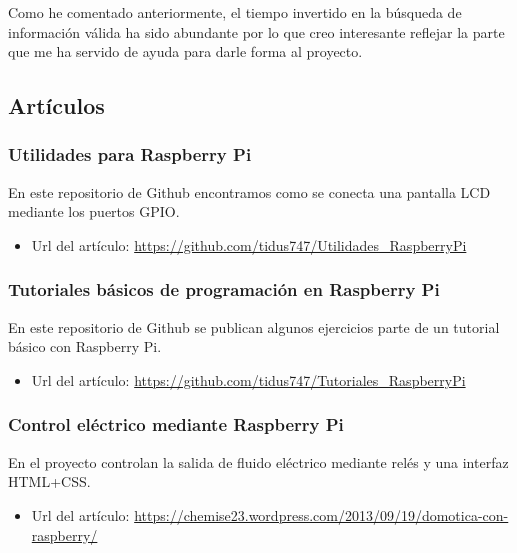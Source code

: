 \begin{comment}
Este apartado sería parecido a un estado del arte de una tesis o tesina. En un trabajo final grado no parece obligada su presencia, aunque se puede dejar a juicio del tutor el incluir un pequeño resumen comentado de los trabajos y proyectos ya realizados en el campo del proyecto en curso. 
\end{comment}

Como he comentado anteriormente, el tiempo invertido en la búsqueda de información válida ha sido abundante por lo que creo interesante reflejar la parte que me ha servido de ayuda para darle forma al proyecto.


\subsection{Artículos}
\subsubsection{Utilidades para Raspberry Pi}
En este repositorio de Github encontramos como se conecta una pantalla LCD mediante los puertos GPIO.
\begin{itemize}
    \item Url del artículo: \url{https://github.com/tidus747/Utilidades_RaspberryPi}
\end{itemize}

\subsubsection{Tutoriales básicos de programación en Raspberry Pi}
En este repositorio de Github se publican algunos ejercicios parte de un tutorial básico con Raspberry Pi.
\begin{itemize}
    \item Url del artículo: \url{https://github.com/tidus747/Tutoriales_RaspberryPi}
\end{itemize}

\subsubsection{Control eléctrico mediante Raspberry Pi}
En el proyecto controlan la salida de fluido eléctrico mediante relés y una interfaz HTML+CSS.
\begin{itemize}
    \item Url del artículo: \url{https://chemise23.wordpress.com/2013/09/19/domotica-con-raspberry/}
\end{itemize}

